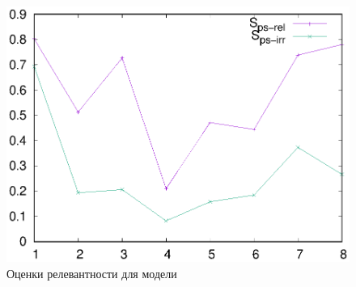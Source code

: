 \begin{figure}
    \centerline{\includegraphics[scale=0.8]{311_scores.eps}}
    \caption{Оценки релевантности для модели}\label{fig:gram-scores}
\end{figure}


